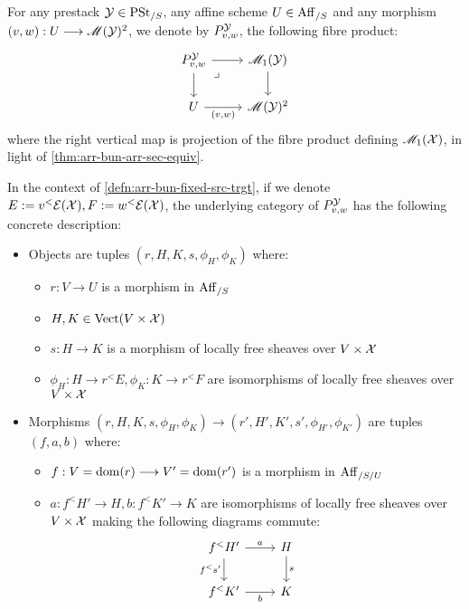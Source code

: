 \documentclass[11pt]{amsart}
\begin{document}
\begin{defn}\label{defn:arr-bun-fixed-src-trgt}
For any prestack $\mathcal{Y} \in \mathrm{PSt}_{/S}$, any affine scheme $U \in \mathrm{Aff}_{/S}$ and any
morphism $(v, w) : U \to \sM(\mcY)^2$, we denote by $P^{\mathcal{Y}}_{v, w}$,
the following fibre product:
\[\begin{tikzcd}
P^\mcY_{v, w} \ar[r] \ar[d] \ar[rd, phantom, "\lrcorner" very near start] &
\sM_1(\mcY) \ar[d] \\
U \ar[r, "{(v, w)}" below] &
\sM(\mcY)^2
\end{tikzcd}\]
where the right vertical map is projection of the fibre product defining
$\mathscr{M}_1(\mathcal{X})$, in light of \cref{thm:arr-bun-arr-sec-equiv}.
\end{defn}

\begin{prop}\label{prop:bndry-map-fibre-concrete}
In the context of \cref{defn:arr-bun-fixed-src-trgt},
if we denote $E := v^<\mathcal{E}(\mathcal{X}), F := w^<\mathcal{E}(\mathcal{X})$, the underlying category of
$P^\mathcal{Y}_{v, w}$ has the following concrete description:
\begin{itemize}
\item Objects are tuples $(r, H, K, s, \phi_{H}, \phi_{K})$ where:
  \begin{itemize}
  \item $r : V \to U$ is a morphism in $\mathrm{Aff}_{/S}$
  \item $H, K \in \mathrm{Vect}(V \times \mathcal{X})$
  \item $s : H \to K$ is a morphism of locally free sheaves over $V \times \mathcal{X}$
  \item $\phi_{H} : H \to r^<E, \phi_{K} : K \to r^<F$ are isomorphisms of
    locally free sheaves over $V \times \mathcal{X}$
  \end{itemize}
\item Morphisms $(r, H, K, s, \phi_{H}, \phi_{K}) \to
  (r', H', K', s', \phi_{H'}, \phi_{K'})$ are tuples
  $(f, a, b)$ where:
  \begin{itemize}
  \item $f : V = \dom(r) \to V' = \dom(r')$ is a morphism in $\mathrm{Aff}_{/S/U}$
  \item $a : f^<H' \to H, b : f^<K' \to K$ are isomorphisms of locally free sheaves
    over $V \times \mathcal{X}$ making the following diagrams commute:
    \[\begin{tikzcd}
    f^<H' \ar[r, "a"] \ar[d, "f^<s'" left] & H \ar[d, "s"] \\
    f^<K' \ar[r, "b" below] & K
    \end{tikzcd}\hspace{1.5em}
\]
\end{itemize}
\end{itemize}
\end{prop}
\end{document}
